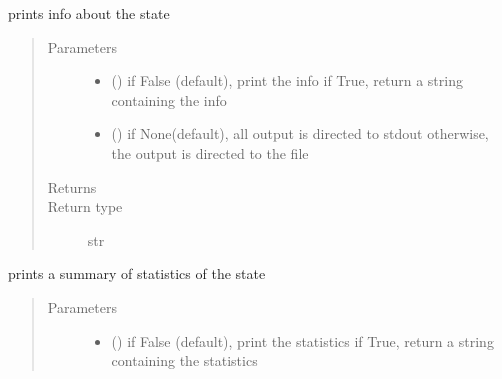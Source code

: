 \documentclass[letterpaper,10pt,english]{sphinxmanual}
\begin{document}
\begin{fulllineitems}
\begin{fulllineitems}
\begin{quote}
\begin{description}
\end{description}\end{quote}

\end{fulllineitems}


\begin{fulllineitems}
\label{\detokenize{Reference:salabim.State.print_info}}
prints info about the state
\begin{quote}\begin{description}
\item[{Parameters}] \leavevmode\begin{itemize}
\item {} 
 () \textendash{} if False (default), print the info
if True, return a string containing the info

\item {} 
 () \textendash{} if None(default), all output is directed to stdout 
otherwise, the output is directed to the file

\end{itemize}

\item[{Returns}] \leavevmode
{}

\item[{Return type}] \leavevmode
str

\end{description}\end{quote}

\end{fulllineitems}


\begin{fulllineitems}
\label{\detokenize{Reference:salabim.State.print_statistics}}
prints a summary of statistics of the state
\begin{quote}\begin{description}
\item[{Parameters}] \leavevmode\begin{itemize}
\item {} 
 () \textendash{} if False (default), print the statistics
if True, return a string containing the statistics


\end{itemize}
\end{description}
\end{quote}
\end{fulllineitems}
\end{fulllineitems}
\end{document}
